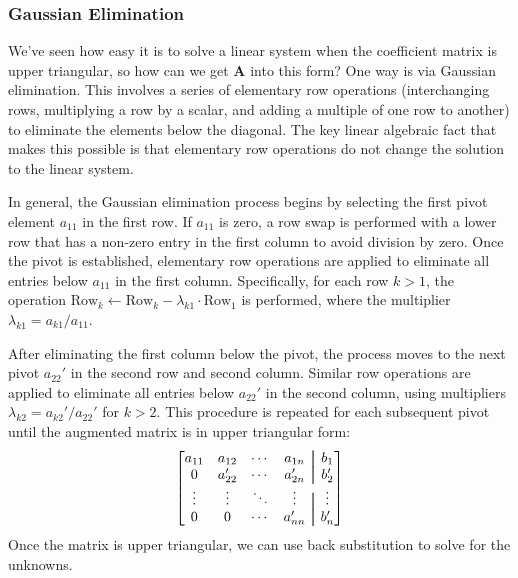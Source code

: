 \subsubsection{Gaussian Elimination}
We've seen how easy it is to solve a linear system when the coefficient matrix is upper triangular, so how can we get $\mathbf{A}$ into this form? One way is via Gaussian elimination. This involves a series of elementary row operations (interchanging rows, multiplying a row by a scalar, and adding a multiple of one row to another) to eliminate the elements below the diagonal. The key linear algebraic fact that makes this possible is that elementary row operations do not change the solution to the linear system.

In general, the Gaussian elimination process begins by selecting the first pivot element $ a_{11} $ in the first row. If $ a_{11} $ is zero, a row swap is performed with a lower row that has a non-zero entry in the first column to avoid division by zero. Once the pivot is established, elementary row operations are applied to eliminate all entries below $ a_{11} $ in the first column. Specifically, for each row $ k > 1 $, the operation $ \text{Row}_k \leftarrow \text{Row}_k - \lambda_{k1} \cdot \text{Row}_1 $ is performed, where the multiplier $ \lambda_{k1} = a_{k1}/a_{11} $.

After eliminating the first column below the pivot, the process moves to the next pivot $ a_{22}' $ in the second row and second column. Similar row operations are applied to eliminate all entries below $ a_{22}' $ in the second column, using multipliers $ \lambda_{k2} = a_{k2}'/a_{22}' $ for $ k > 2 $. This procedure is repeated for each subsequent pivot until the augmented matrix is in upper triangular form:
\begin{equation*}
    \begin{bmatrix}
        a_{11} & a_{12} & \cdots & a_{1n} & \aug & b_1 \\
        0 & a_{22}' & \cdots & a_{2n}' & \aug & b_2' \\
        \vdots & \vdots & \ddots & \vdots & \aug & \vdots \\
        0 & 0 & \cdots & a_{nn}' & \aug & b_n' \\
    \end{bmatrix}
\end{equation*}
Once the matrix is upper triangular, we can use back substitution to solve for the unknowns.

